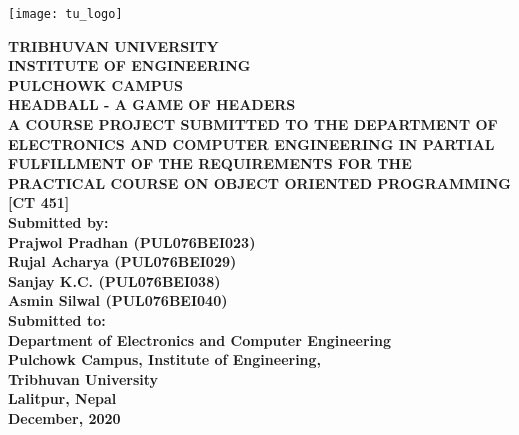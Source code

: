 \documentclass[main.tex]{subfiles}
\begin{document}
\begin{titlepage}
	\begin{center}

	\texttt{[image: tu\_logo]}

\textbf{	TRIBHUVAN UNIVERSITY\\
	INSTITUTE OF ENGINEERING\\
	PULCHOWK CAMPUS}\\
	[2cm]

\textbf{	HEADBALL - A GAME OF HEADERS}\\
	[2cm]

\textbf{	A COURSE PROJECT SUBMITTED TO THE DEPARTMENT OF ELECTRONICS AND COMPUTER ENGINEERING IN PARTIAL FULFILLMENT OF THE REQUIREMENTS FOR THE PRACTICAL COURSE ON OBJECT ORIENTED PROGRAMMING [CT 451]}\\
	[2cm]

\textbf{	Submitted by:\\
	Prajwol Pradhan (PUL076BEI023)\\
	Rujal Acharya (PUL076BEI029)\\
	Sanjay K.C. (PUL076BEI038)\\
	Asmin Silwal (PUL076BEI040)}\\
	[2cm]

\textbf{Submitted to:\\
	Department of Electronics and Computer Engineering\\
	Pulchowk Campus, 	Institute of Engineering,\\ Tribhuvan University\\
	Lalitpur, Nepal}\\
	[2cm]

\textbf{	December, 2020}

	\end{center}
\end{titlepage} 
\end{document}
